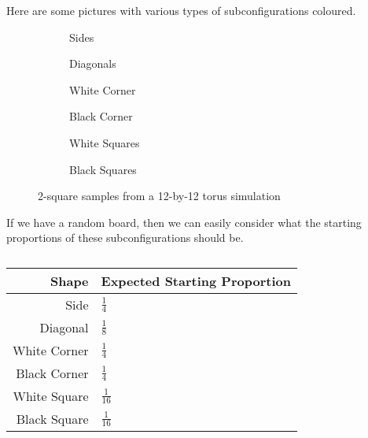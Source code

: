 \documentclass[12pt]{article}
\theoremstyle{definition}
\theoremstyle{remark}
\theoremstyle{remark}
\begin{document}
\par
Here are some pictures with various types of subconfigurations coloured.
\begin{figure}[H]
  \centering
  \begin{subfigure}[b]{0.3\linewidth}
    \caption{Sides}
  \end{subfigure}
  \begin{subfigure}[b]{0.3\linewidth}
    \caption{Diagonals}
  \end{subfigure}
  \begin{subfigure}[b]{0.3\linewidth}
    \caption{White Corner}
  \end{subfigure}
  \begin{subfigure}[b]{0.3\linewidth}
    \caption{Black Corner}
  \end{subfigure}
  \begin{subfigure}[b]{0.3\linewidth}
    \caption{White Squares}
  \end{subfigure}
  \begin{subfigure}[b]{0.3\linewidth}
    \caption{Black Squares}
  \end{subfigure}
  \caption{2-square samples from a 12-by-12 torus simulation}
\end{figure}

\par
If we have a random board, then we can easily consider what the starting proportions of these subconfigurations should be. 
\begin{table}[H]
\begin{tabular}{r | l}
  Shape & Expected Starting Proportion \\ \hline
  Side & $\frac{1}{4}$ \\
  Diagonal & $\frac{1}{8}$ \\
  White Corner & $\frac{1}{4}$ \\
  Black Corner & $\frac{1}{4}$ \\
  White Square & $\frac{1}{16}$ \\
  Black Square & $\frac{1}{16}$ \\
\end{tabular}
\caption{}
\end{table}
\end{document}
